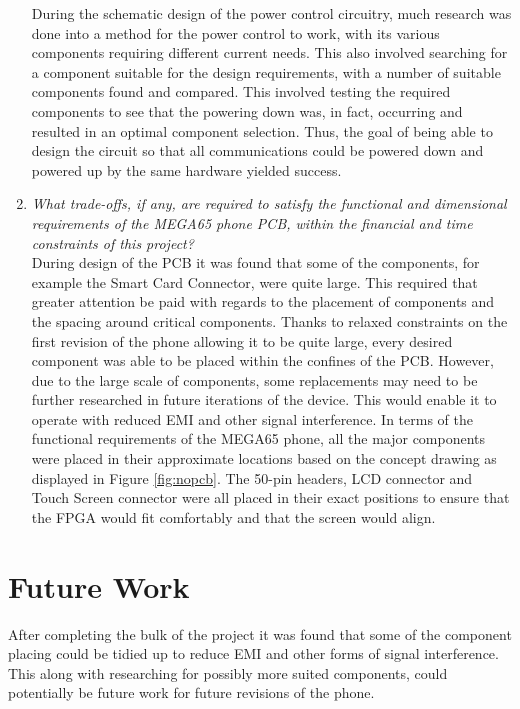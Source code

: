 \begin{enumerate}
	During the schematic design of the power control circuitry, much research was done into a method for the power control to work, with its various components requiring different current needs. 
This also involved searching for a component suitable for the design requirements, with a number of suitable components found and compared. 
This involved testing the required components to see that the powering down was, in fact, occurring and resulted in an optimal component selection. 
Thus, the goal of being able to design the circuit so that all communications could be powered down and powered up by the same hardware yielded success.\\
	
\item \textit{What trade-offs, if any, are required to satisfy the functional and dimensional requirements of the MEGA65 phone PCB, within the financial and time constraints of this project?}\\

	During design of the PCB it was found that some of the components, for example the Smart Card Connector, were quite large. 
This required that greater attention be paid with regards to the placement of components and the spacing around critical components. 
Thanks to relaxed constraints on the first revision of the phone allowing it to be quite large, every desired component was able to be placed within the confines of the PCB. 
However, due to the large scale of components, some replacements may need to be further researched in future iterations of the device. 
This would enable it to operate with reduced EMI and other signal interference.
In terms of the functional requirements of the MEGA65 phone, all the major components were placed in their approximate locations based on the concept drawing as displayed in Figure \ref{fig:nopcb}. 
The 50-pin headers, LCD connector and Touch Screen connector were all placed in their exact positions to ensure that the FPGA would fit comfortably and that the screen would align.\\

\end{enumerate}

\section{Future Work}

	After completing the bulk of the project it was found that some of the component placing could be tidied up to reduce EMI and other forms of signal interference. This along with researching for possibly more suited components, could potentially be future work for future revisions of the phone. 



